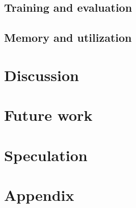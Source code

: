 \documentclass[sigconf]{acmart}
\begin{document}
\subsection{Training and evaluation}\label{subsec:training-and-evaluation}

\subsection{Memory and utilization}\label{subsec:memory-and-utilization}

\section{Discussion}\label{sec:discussion}


\section{Future work}\label{sec:futurework}

\section{Speculation}\label{sec:speculation}


%


\appendix
\appendixpage
\addappheadtotoc

\section{Appendix}\label{sec:appendix}

%
\end{document}
